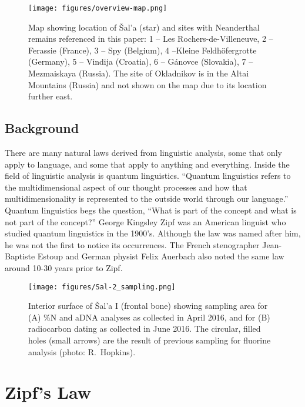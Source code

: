 \documentclass[a4paper,10pt]{article}
\begin{document}
\begin{figure}
	\centering
	\texttt{[image: figures/overview-map.png]}
	\caption{Map showing location of Šal’a (star) and sites with Neanderthal remains referenced in this paper: 1 -- Les Rochers-de-Villeneuve, 2 -- Ferassie (France), 3 -- Spy (Belgium), 4 --Kleine Feldhöfergrotte (Germany), 5 -- Vindija (Croatia), 6 -- Gánovce (Slovakia), 7 -- Mezmaiskaya (Russia). The site of Okladnikov is in the Altai Mountains (Russia) and not shown on the map due to its location further east.}
	\label{fig:map}
\end{figure}


\subsection{Background}

There are many natural laws derived from linguistic analysis, some that only apply to language, and some that apply to anything and everything. Inside the field of linguistic analysis is quantum linguistics. “Quantum linguistics refers to the multidimensional aspect of our thought processes and how that multidimensionality is represented to the outside world through our language.” Quantum linguistics begs the question, “What is part of the concept and what is not part of the concept?” George Kingsley Zipf was an American linguist who studied quantum linguistics in the 1900’s. Although the law was named after him, he was not the first to notice its occurrences. The French stenographer Jean-Baptiste Estoup and German physist Felix Auerbach also noted the same law around 10-30 years prior to Zipf.   



	\begin{figure}[t]
		\centering
		\texttt{[image: figures/Sal-2\_sampling.png]}
		\caption{Interior surface of Šal’a I (frontal bone) showing sampling area for (A) \%N and aDNA analyses as collected in April 2016, and for (B) radiocarbon dating as collected in June 2016. The circular, filled holes (small arrows) are the result of previous sampling for fluorine analysis (photo: R.~Hopkins).}
		\label{fig:Sal-I}
	\end{figure}

\section{Zipf's Law}
\end{document}
